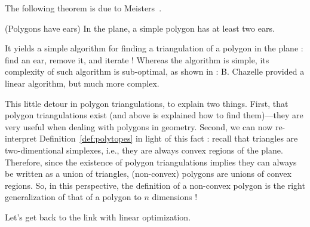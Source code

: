 \begin{example}
\begin{center}
    \end{center}
\end{example}

The following theorem is due to Meisters~\cite{meisters1975}.

\begin{theorem}(Polygons have ears)
    In the plane, a simple polygon has at least two ears.
\end{theorem}

\begin{remark}
    It yields a simple algorithm for finding a triangulation of a polygon in the plane : find an ear, remove it, and iterate ! Whereas the algorithm is simple, its complexity of such algorithm is sub-optimal, as shown in \cite{chazelle1991} : B. Chazelle provided a linear algorithm, but much more complex.
\end{remark}

\begin{remark}
    This little detour in polygon triangulations, to explain two things. First, that polygon triangulations exist (and above is explained how to find them)---they are very useful when dealing with polygons in geometry. Second, we can now re-interpret Definition~\ref{def:polytopes} in light of this fact : recall that triangles are two-dimentional simplexes, i.e., they are always convex regions of the plane. Therefore, since the existence of polygon triangulations implies they can always be written as a union of triangles, (non-convex) polygons are unions of convex regions. So, in this perspective, the definition of a non-convex polygon is the right generalization of that of a polygon to $ n $ dimensions !
\end{remark}

Let's get back to the link with linear optimization.

